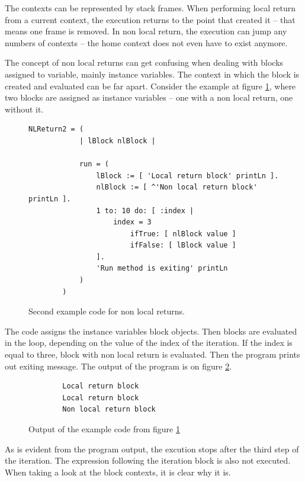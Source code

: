 \documentclass[thesis=M,english]{FITthesis}[2019/12/23]
\begin{document}
The contexts can be represented by stack frames. When performing local return from a current context, the execution returns to the
point that created it -- that means one frame is removed. In non local return, the execution can jump any numbers of contexts -- the
home context does not even have to exist anymore.

The concept of non local returns can get confusing when dealing with blocks assigned to variable, mainly instance variables.
The context in which the block is created and evaluated can be far apart. Consider the example at figure \ref{fig:nlreturn_2}, where two blocks are
assigned as instance variables -- one with a non local return, one without it.

\begin{figure}
	\centering
	\begin{lstlisting}[language=Smalltalk]
		NLReturn2 = (
			| lBlock nlBlock |

			run = (
				lBlock := [ 'Local return block' printLn ].
				nlBlock := [ ^'Non local return block' printLn ].
				1 to: 10 do: [ :index |
					index = 3
						ifTrue: [ nlBlock value ]
						ifFalse: [ lBlock value ]
				].
				'Run method is exiting' printLn
			)
		)
	\end{lstlisting}
	\caption{Second example code for non local returns.}
	\label{fig:nlreturn_2}
\end{figure}

The code assigns the instance variables block objects. Then blocks are evaluated in the loop, depending on the value
of the index of the iteration. If the index is equal to three, block with non local return is evaluated. Then the program
prints out exiting message. The output of the program is on figure \ref{fig:nlreturn_2_output}.

\begin{figure}[h!]
	\centering
	\begin{verbatim}
		Local return block
		Local return block
		Non local return block
	\end{verbatim}
	\caption{Output of the example code from figure \ref{fig:nlreturn_2}}
	\label{fig:nlreturn_2_output}
\end{figure}

As is evident from the program output, the excution stops after the third step of the iteration. The expression
following the iteration block is also not executed. When taking a look at the block contexts, it is clear why it is.
\end{document}
